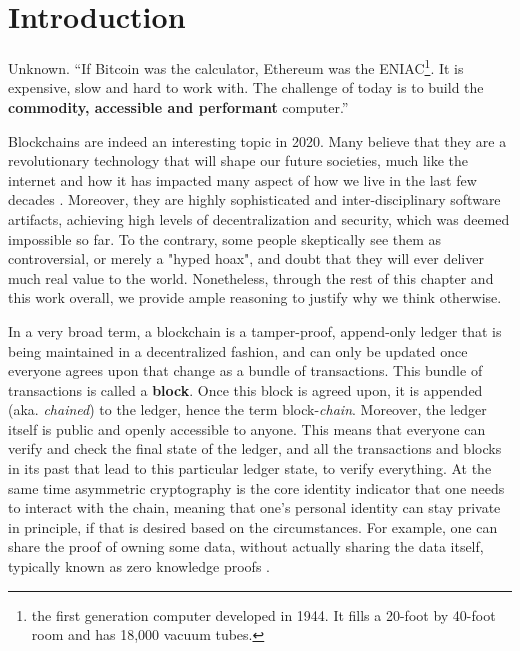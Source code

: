 \chapter{Introduction} \label{chap:intoroduction}

\ifpdf
    \graphicspath{{1_introduction/figures/PNG/}{1_introduction/figures/PDF/}{1_introduction/figures/}}
\else
    \graphicspath{{1_introduction/figures/EPS/}{1_introduction/figures/}}
\fi

\begin{chapquote}{Unknown.}
``If Bitcoin was the calculator, Ethereum was the ENIAC\footnote{the first generation computer
developed in 1944. It fills a 20-foot by 40-foot room and has 18,000 vacuum tubes.}. It is
expensive, slow and hard to work with. The challenge of today is to build the \textbf{commodity,
accessible and performant} computer.''
\end{chapquote}


Blockchains are indeed an interesting topic in 2020. Many believe that they are a revolutionary
technology that will shape our future societies, much like the internet and how it has impacted many
aspect of how we live in the last few decades \cite{will_blockchain_be_big_deal}. Moreover, they are
highly sophisticated and inter-disciplinary software artifacts, achieving high levels of
decentralization and security, which was deemed impossible so far. To the contrary, some people
skeptically see them as controversial, or merely a "hyped hoax", and doubt that they will ever
deliver much real value to the world. Nonetheless, through the rest of this chapter and this work
overall, we provide ample reasoning to justify why we think otherwise.

In a very broad term, a blockchain is a tamper-proof, append-only ledger that is being maintained in
a decentralized fashion, and can only be updated once everyone agrees upon that change as a bundle
of transactions. This bundle of transactions is called a \textbf{block}. Once this block is agreed
upon, it is appended (aka. \textit{chained}) to the ledger, hence the term block-\textit{chain}.
Moreover, the ledger itself is public and openly accessible to anyone. This means that everyone can
verify and check the final state of the ledger, and all the transactions and blocks in its past that
lead to this particular ledger state, to verify everything. At the same time asymmetric cryptography
is the core identity indicator that one needs to interact with the chain, meaning that one's
personal identity can stay private in principle, if that is desired based on the circumstances. For
example, one can share the proof of owning some data, without actually sharing the data itself,
typically known as zero knowledge proofs \cite{Goldreich_Oren_1994_ZK}.

